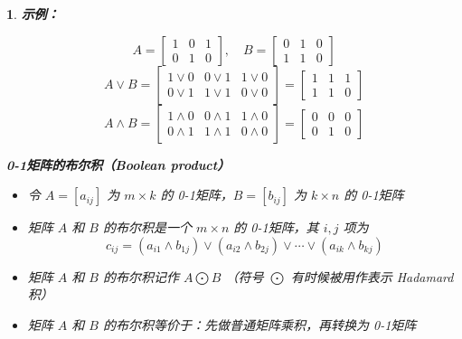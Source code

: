 \documentclass[UTF8]{report}
\theoremstyle{MyLineTheoremStyle} %
\theoremstyle{MyBlockTheoremStyle} %
\theoremstyle{MySubsubsectionStyle} %
\newtheorem{definition}{}
\begin{document}
\begin{definition}
        \textbf{示例：}\par
        \[
        A =
        \begin{bmatrix}
        1 & 0 & 1 \\
        0 & 1 & 0
        \end{bmatrix}
        , \quad
        B =
        \begin{bmatrix}
        0 & 1 & 0 \\
        1 & 1 & 0
        \end{bmatrix}
        \]
        \[
        A \lor B =
        \begin{bmatrix}
        1 \lor 0 & 0 \lor 1 & 1 \lor 0 \\
        0 \lor 1 & 1 \lor 1 & 0 \lor 0
        \end{bmatrix}
        =
        \begin{bmatrix}
        1 & 1 & 1 \\
        1 & 1 & 0
        \end{bmatrix}
        \]
        \[
        A \land B =
        \begin{bmatrix}
        1 \land 0 & 0 \land 1 & 1 \land 0 \\
        0 \land 1 & 1 \land 1 & 0 \land 0
        \end{bmatrix}
        =
        \begin{bmatrix}
        0 & 0 & 0 \\
        0 & 1 & 0
        \end{bmatrix}
        \]
    

        \textbf{0-1矩阵的布尔积（Boolean product）}\par
        \begin{itemize}
            \item 令 $A = [a_{ij}]$ 为 $m \times k$ 的 0-1矩阵，$B = [b_{ij}]$ 为 $k \times n$ 的 0-1矩阵
            \item 矩阵 $A$ 和 $B$ 的布尔积是一个 $m \times n$ 的 0-1矩阵，其 $i,j$ 项为
            \[
            c_{ij} = (a_{i1} \land b_{1j}) \lor (a_{i2} \land b_{2j}) \lor \cdots \lor (a_{ik} \land b_{kj})
            \]
            \item 矩阵 $A$ 和 $B$ 的布尔积记作 $A \bigodot  B$ （符号 $\bigodot $ 有时候被用作表示 Hadamard积）
            \item 矩阵 $A$ 和 $B$ 的布尔积等价于：先做普通矩阵乘积，再转换为 0-1矩阵
        \end{itemize}
    

\end{definition}
\end{document}
